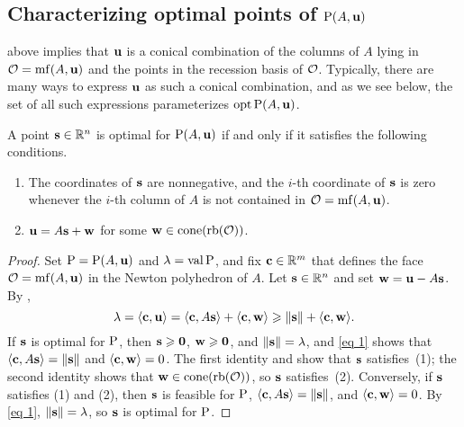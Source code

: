 \documentclass[11pt]{amsart}
\begin{document}
\subsection{Characterizing optimal points of $\mathrm{P}(A,\mathbf{u})$}

 above implies that $\mathbf{u}$ is a conical combination of the columns of $A$ lying in $\mathcal{O} = \operatorname{mf}(A,\mathbf{u})$ and the points in the recession basis of $\mathcal{O}$.
Typically, there are many ways to express $\mathbf{u}$ as such a conical combination, and as we see below, the set of all such expressions parameterizes  $\operatorname{opt} \mathrm{P}(A, \mathbf{u})$.

\begin{proposition}\label{opt set: P}
   A point $\mathbf{s} \in \mathbb{R}^n$ is optimal for $\mathrm{P}(A, \mathbf{u})$ if and only if it satisfies the following conditions.
\begin{enumerate}
\item  \label{mc coords: e} The coordinates of $\mathbf{s}$ are nonnegative, and the $i$-th coordinate of $\mathbf{s}$ is zero whenever the $i$-th column of $A$ is not contained in $\mathcal{O} = \operatorname{mf}(A, \mathbf{u})$.
\item  \label{mc decomposition: e} $\mathbf{u} = A \mathbf{s} + \mathbf{w}$ for some $\mathbf{w} \in  \operatorname{cone}(\operatorname{rb}(\mathcal{O}))$.
\end{enumerate}
\end{proposition}

\begin{proof}
   Set $\mathrm{P} = \mathrm{P}(A, \mathbf{u})$ and $\lambda = \operatorname{val} \mathrm{P} $, and fix $\mathbf{c} \in \mathbb{R}^m$ that defines the face $\mathcal{O} = \operatorname{mf}(A, \mathbf{u})$ in the Newton polyhedron of $A$.
   Let $\mathbf{s} \in \mathbb{R}^n$ and set $\mathbf{w} = \mathbf{u} - A\mathbf{s}$.
   By ,
   \begin{equation}\label{eq 1}
      \lambda = \langle \mathbf{c}, \mathbf{u} \rangle = \langle \mathbf{c}, A \mathbf{s} \rangle + \langle \mathbf{c}, \mathbf{w} \rangle \geqslant \| \mathbf{s} \| + \langle \mathbf{c}, \mathbf{w} \rangle.
   \end{equation}
   If $\mathbf{s}$ is optimal for $\mathrm{P}$, then $\mathbf{s} \geqslant \mathbf{0}$, $\mathbf{w} \geqslant \mathbf{0}$, and $\| \mathbf{s} \| = \lambda$, and \eqref{eq 1} shows that $\langle \mathbf{c}, A \mathbf{s} \rangle = \| \mathbf{s} \|$ and $\langle \mathbf{c}, \mathbf{w} \rangle = 0$.
   The first identity and  show that $\mathbf{s}$ satisfies~(1); the second identity shows that $\mathbf{w}\in \operatorname{cone}(\operatorname{rb}(\mathcal{O}))$, so $\mathbf{s}$ satisfies~(2).
   Conversely, if $\mathbf{s}$ satisfies (1) and (2), then $\mathbf{s}$ is feasible for $\mathrm{P}$, $\langle \mathbf{c}, A \mathbf{s} \rangle = \| \mathbf{s} \|$, and $\langle \mathbf{c}, \mathbf{w} \rangle = 0$.
   By \eqref{eq 1}, $\| \mathbf{s} \| = \lambda$, so $\mathbf{s}$ is optimal for $\mathrm{P}$.
\end{proof}
\end{document}
